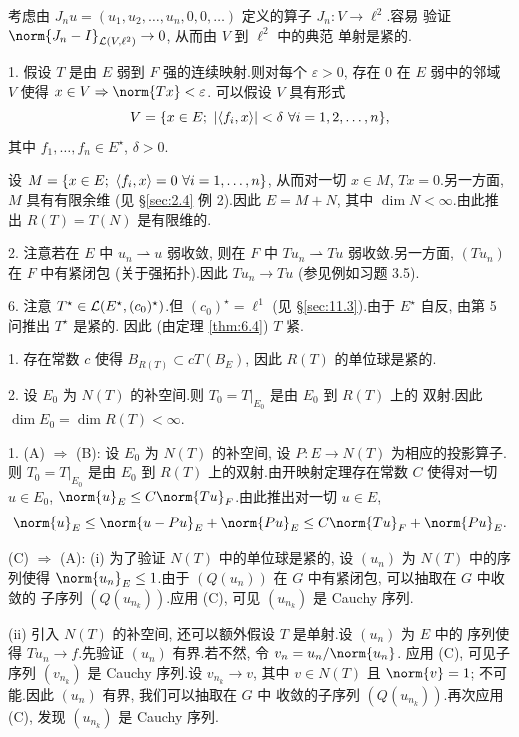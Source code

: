 考虑由 $J_nu=(u_1,u_2,\dots,u_n,0,0,\dots)$ 定义的算子 $J_n:V\to\ell^2$.容易
验证 $\norm{J_n-I}_{\LL(V,\ell^2)}\to0$, 从而由 $V$ 到 $\ell^2$ 中的典范
单射是紧的.


1. 假设 $T$ 是由 $E$ 弱到 $F$ 强的连续映射.则对每个 $\varepsilon>0$, 存在
$0$ 在 $E$ 弱中的邻域 $V$ 使得 $x\in V\Rightarrow\norm{Tx}<\varepsilon$.
可以假设 $V$ 具有形式
\begin{equation*}
V=\{x\in E;\ \abs{\dual{f_i}{x}}<\delta\ \forall i=1,2,\dots,n\},
\end{equation*}
其中 $f_1,\dots,f_n\in E^\star$, $\delta>0$.

设 $M=\{x\in E;\ \left\langle f_i,x\right\rangle=0\ \forall i=1,\dots,n\}$, 从而对一切 $x\in M$,
$Tx=0$.另一方面, $M$ 具有有限余维 (见 \S \ref{sec:2.4} 例 2).因此
$E=M+N$, 其中 $\dim N<\infty$.由此推出 $R(T)=T(N)$ 是有限维的.

2. 注意若在 $E$ 中 $u_n\rightharpoonup u$ 弱收敛, 则在 $F$ 中
$Tu_n\rightharpoonup Tu$ 弱收敛.另一方面, $(Tu_n)$ 在 $F$ 中有紧闭包
(关于强拓扑).因此 $Tu_n\to Tu$ (参见例如习题 3.5).

6. 注意 $T^\star\in\mathcal{L}(E^\star,(c_0)^\star)$.但 $(c_0)^\star=\ell^1$ (见
\S \ref{sec:11.3}).由于 $E^\star$ 自反, 由第 5 问推出 $T^\star$ 是紧的.
因此 (由定理  \ref{thm:6.4}) $T$ 紧.


1. 存在常数 $c$ 使得 $B_{R(T)}\subset cT(B_E)$, 因此 $R(T)$ 的单位球是紧的.

2. 设 $E_0$ 为 $N(T)$ 的补空间.则 $T_0=T|_{E_0}$ 是由 $E_0$ 到 $R(T)$ 上的
双射.因此 $\dim E_0=\dim R(T)<\infty$.


1. (A) $\Rightarrow$ (B):
设 $E_0$ 为 $N(T)$ 的补空间, 设 $P:E\to N(T)$ 为相应的投影算子.则
$T_0=T|_{E_0}$ 是由 $E_0$ 到 $R(T)$ 上的双射.由开映射定理存在常数 $C$
使得对一切 $u\in E_0$, $\norm{u}_E\le C\norm{Tu}_F$.由此推出对一切 $u\in E$,
\begin{equation*}
\norm{u}_E\le\norm{u-Pu}_E+\norm{Pu}_E\le C\norm{Tu}_F+\norm{Pu}_E.
\end{equation*}

(C) $\Rightarrow$ (A):
(i) 为了验证 $N(T)$ 中的单位球是紧的, 设 $(u_n)$ 为 $N(T)$ 中的序列使得
$\norm{u_n}_E\le1$.由于 $(Q(u_n))$ 在 $G$ 中有紧闭包, 可以抽取在 $G$ 中收敛的
子序列 $(Q(u_{n_k}))$.应用 (C), 可见 $(u_{n_k})$ 是 Cauchy 序列.

(ii) 引入 $N(T)$ 的补空间, 还可以额外假设 $T$ 是单射.设 $(u_n)$ 为 $E$ 中的
序列使得 $Tu_n\to f$.先验证 $(u_n)$ 有界.若不然, 令 $v_n=u_n/\norm{u_n}$.
应用 (C), 可见子序列 $(v_{n_k})$ 是 Cauchy 序列.设 $v_{n_k}\to v$, 其中
$v\in N(T)$ 且 $\norm{v}=1$; 不可能.因此 $(u_n)$ 有界, 我们可以抽取在 $G$ 中
收敛的子序列 $(Q(u_{n_k}))$.再次应用 (C), 发现 $(u_{n_k})$ 是 Cauchy 序列.

